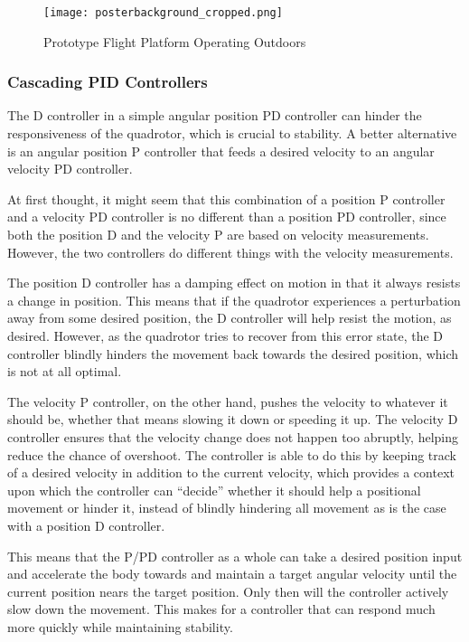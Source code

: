 \documentclass[12pt,letterpaper]{article}
\begin{document}
\begin{figure}[h!] 
\texttt{[image: posterbackground\_cropped.png]}
\caption{Prototype Flight Platform Operating Outdoors}
\end{figure}



\subsubsection*{Cascading PID Controllers}

The D controller in a simple angular position PD controller can hinder the
responsiveness of the quadrotor, which is crucial to stability. A better
alternative is an angular position P controller that feeds a desired velocity
to an angular velocity PD controller.

At first thought, it might seem that this combination of a position P
controller and a velocity PD controller is no different than a position PD
controller, since both the position D and the velocity P are based on velocity
measurements. However, the two controllers do different things with the
velocity measurements.

The position D controller has a damping effect on motion in that it always
resists a change in position. This means that if the quadrotor experiences a
perturbation away from some desired position, the D controller will help resist
the motion, as desired. However, as the quadrotor tries to recover from this
error state, the D controller blindly hinders the movement back towards the
desired position, which is not at all optimal.

The velocity P controller, on the other hand, pushes the velocity to whatever
it should be, whether that means slowing it down or speeding it up. The
velocity D controller ensures that the velocity change does not happen too
abruptly, helping reduce the chance of overshoot. The controller is able to do
this by keeping track of a desired velocity in addition to the current
velocity, which provides a context upon which the controller can ``decide''
whether it should help a positional movement or hinder it, instead of blindly
hindering all movement as is the case with a position D controller.

This means that the P/PD controller as a whole can take a desired position
input and accelerate the body towards and maintain a target angular velocity
until the current position nears the target position. Only then will the
controller actively slow down the movement. This makes for a controller that
can respond much more quickly while maintaining stability.
\end{document}
